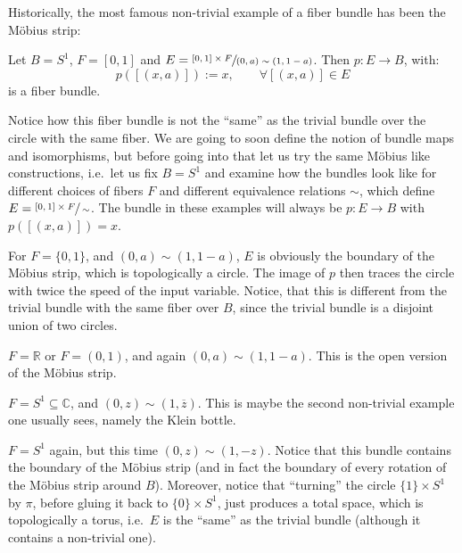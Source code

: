 Historically, the most famous non-trivial example of a fiber bundle has been the M\"obius strip:
\begin{example} Let $B=S^1$, $F=[0,1]$ and $E=\sfrac{[0,1]\times F}{(0,a)\sim(1,1-a)}$. Then $p:E\to B$, with:
\[p([(x,a)]):= x,\qquad\forall [(x,a)]\in E\]
is a fiber bundle.
\end{example}
Notice how this fiber bundle is not the ``same'' as the trivial bundle over the circle with the same fiber. We are going to soon define the notion of bundle maps and isomorphisms, but before going into that let us try the same M\"obius like constructions, i.e.\ let us fix $B=S^1$ and examine how the bundles look like for different choices of fibers $F$ and different equivalence relations $\sim$, which define $E=\sfrac{[0,1]\times F}{\sim}$. The bundle in these examples will always be $p:E\to B$ with $p([(x,a)])=x$.

\begin{examples}
\begin{i_enum}
\item For $F=\{0,1\}$, and $(0,a)\sim(1,1-a)$, $E$ is obviously the boundary of the M\"obius strip, which is topologically a circle. The image of $p$ then traces the circle with twice the speed of the input variable. Notice, that this is different from the trivial bundle with the same fiber over $B$, since the trivial bundle is a disjoint union of two circles.
\item $F=\mathbb{R}$ or $F=(0,1)$, and again $(0,a)\sim(1,1-a)$. This is the open version of the M\"obius strip.
\item $F=S^1\subseteq\mathbb{C}$, and $(0,z)\sim(1,\overline{z})$. This is maybe the second non-trivial example one usually sees, namely the Klein bottle.
\item $F=S^1$ again, but this time $(0,z)\sim(1,-z)$. Notice that this bundle contains the boundary of the M\"obius strip (and in fact the boundary of every rotation of the M\"obius strip around $B$). Moreover, notice that ``turning'' the circle $\{1\}\times S^1$ by $\pi$, before gluing it back to $\{0\}\times S^1$, just produces a total space, which is topologically a torus, i.e.\ $E$ is the ``same'' as the trivial bundle (although it contains a non-trivial one).
\end{i_enum}
\end{examples}

